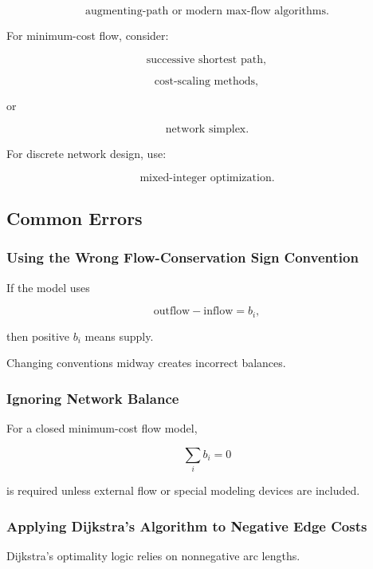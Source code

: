 \[
\boxed{
\text{augmenting-path or modern max-flow algorithms}.
}
\]

For minimum-cost flow, consider:

\[
\boxed{
\text{successive shortest path},
}
\]

\[
\boxed{
\text{cost-scaling methods},
}
\]

or

\[
\boxed{
\text{network simplex}.
}
\]

For discrete network design, use:

\[
\boxed{
\text{mixed-integer optimization}.
}
\]

\subsection{Common Errors}
\label{subsec:network-optimization-common-errors}

\subsubsection{Using the Wrong Flow-Conservation Sign Convention}

If the model uses

\[
\text{outflow}-\text{inflow}=b_i,
\]

then positive \(b_i\) means supply.

Changing conventions midway creates incorrect balances.

\subsubsection{Ignoring Network Balance}

For a closed minimum-cost flow model,

\[
\boxed{
\sum_i b_i=0
}
\]

is required unless external flow or special modeling devices are included.

\subsubsection{Applying Dijkstra's Algorithm to Negative Edge Costs}

Dijkstra's optimality logic relies on nonnegative arc lengths.

